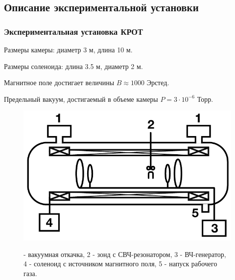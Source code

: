 \documentclass[10pt,pdf,hyperref={unicode}, dvipsnames]{beamer}
\begin{document}
\subsection{Описание экспериментальной установки}
\begin{frame}
	\frametitle{Экспериментальная установка КРОТ}
	Размеры камеры: диаметр 3 м, длина 10 м.

	Размеры соленоида: длина 3.5 м, диаметр 2 м. 
	
	Магнитное поле достигает величины $B\approx 1000$ Эрстед. 
	
	Предельный вакуум, достигаемый в объеме камеры $P =3\cdot10^{-6}$ Торр. 
	\begin{figure}[tb]
		\vspace{0pt}
		\centering
		\includegraphics[width=0.6\linewidth]{fig/krot}
		\label{fig:krot}
		\caption*{ - вакуумная откачка, 2 - зонд с СВЧ-резонатором, 3 - ВЧ-генератор, 4 - соленоид с источником магнитного поля, 5 - напуск рабочего газа.}
	\end{figure}

\end{frame}
\end{document}
